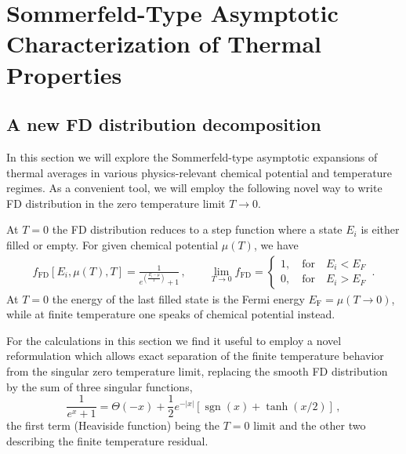 \documentclass[sn-mathphys,Numbered]{sn-jnl}
\DeclareMathOperator{\sgn}{sgn}
\begin{document}
\section{Sommerfeld-Type Asymptotic Characterization of Thermal Properties}\label{sec:Sommerfeld} 
\subsection{A new FD distribution decomposition}\label{FermiDvisit}%
In this section we will explore the Sommerfeld-type asymptotic expansions of thermal averages in various physics-relevant chemical potential and temperature regimes. As a convenient tool, we will employ the following novel way to write FD distribution in the zero temperature limit $T\to0$. 

At $T=0$ the FD distribution reduces to a step function where a state $E_{i}$ is either filled or empty. For given chemical potential $\mu(T)$, we have
\begin{align}
\label{f_old}
f_\mathrm{FD}[E_{i},\mu(T),T]=\frac{1}{\displaystyle e^{\left(\frac{E_{i}-\mu}{T}\right)}+1}\,,\qquad 
\lim_{T\to0}f_\mathrm{FD}=\left\{
\begin{array}{c}
1,\quad\mathrm{for}\quad{E_{i}}<{ E_F}\\
0,\quad\mathrm{for}\quad{E_{i}}>{ E_F}
\end{array}
\right.\,.
\end{align}
At $T=0$ the energy of the last filled state is the Fermi energy ${E_\mathrm{F}=\mu(T\to0)}$, while at finite temperature one speaks of chemical potential instead. 

For the calculations in this section we find it useful to employ a novel reformulation which allows exact separation of the finite temperature behavior from the singular zero temperature limit, replacing the smooth FD distribution by the sum of three singular functions,
\begin{equation}
\frac{1}{e^{x} +1}=\Theta(-x)+\frac{1}{2}e^{-|x|}\left[\sgn(x)+\tanh(x/2)\right]\,,
\end{equation}
the first term (Heaviside function) being the $T=0$ limit and the other two describing the finite temperature residual. 
\end{document}
